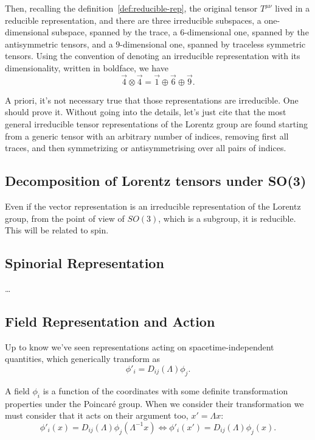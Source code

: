 Then, recalling the definition~\eqref{def:reducible-rep}, the original tensor $T^{\mu\nu}$ lived in a reducible representation, and there are three irreducible subspaces, a one-dimensional subspace, spanned by the trace, a $6$-dimensional one, spanned by the antisymmetric tensors, and a $9$-dimensional one, spanned by traceless symmetric tensors. Using the convention of denoting an irreducible representation with its dimensionality, written in boldface, we have
\begin{equation}
    \vec{4} \otimes \vec{4} = \vec{1} \oplus \vec{6} \oplus \vec{9} .
\end{equation}

A priori, it's not necessary true that those representations are irreducible. One should prove it. Without going into the details, let's just cite that the most general irreducible tensor representations of the Lorentz group are found starting from a generic tensor with an arbitrary number of indices, removing first all traces, and then symmetrizing or antisymmetrising over all pairs of indices.


\color{red}
\subsection{Decomposition of Lorentz tensors under SO(3)}
Even if the vector representation is an irreducible representation of the Lorentz group, from the point of view of $SO(3)$, which is a subgroup, it is reducible. This will be related to spin.




\subsection{Spinorial Representation}
\dots
\color{black}

\subsection{Field Representation and Action}
Up to know we've seen representations acting on spacetime-independent quantities, which generically transform as
\begin{equation}
    \phi'_i  = D_{ij}(\Lambda) \phi_j.
\end{equation}

A field $\phi_i$ is a function of the coordinates with some definite transformation properties under the Poincaré group. When we consider their transformation we must consider that it acts on their argument too, $x' = \Lambda x$:
\begin{equation}
    \phi'_i (x) = D_{ij}(\Lambda) \phi_j(\Lambda^{-1}x) \iff \phi'_i(x') = D_{ij}(\Lambda) \phi_j(x) .
\end{equation}


